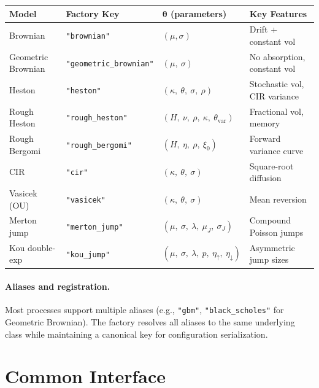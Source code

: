 	\begingroup
	\setlength{\tabcolsep}{3pt}\renewcommand{\arraystretch}{1.1}\scriptsize
	\begin{center}
		\begin{tabular}{@{}p{3cm}p{3.5cm}p{5cm}p{3.5cm}@{}}
			\toprule
			\textbf{Model} & \textbf{Factory Key} & \(\boldsymbol{\theta}\) \textbf{(parameters)} & \textbf{Key Features} \\
			\midrule
			Brownian & \texttt{"brownian"} & \((\mu, \sigma)\) & Drift + constant vol \\
			Geometric Brownian & \texttt{"geometric\_brownian"} & \((\mu,\ \sigma)\) & No absorption, constant vol \\
			Heston & \texttt{"heston"} & \((\kappa,\ \theta,\ \sigma,\ \rho)\) & Stochastic vol, CIR variance \\
			Rough Heston & \texttt{"rough\_heston"} & \((H,\ \nu,\ \rho,\ \kappa,\ \theta_{\text{var}})\) & Fractional vol, memory \\
			Rough Bergomi & \texttt{"rough\_bergomi"} & \((H,\ \eta,\ \rho,\ \xi_0)\) & Forward variance curve \\
			CIR & \texttt{"cir"} & \((\kappa,\ \theta,\ \sigma)\) & Square-root diffusion \\
			Vasicek (OU) & \texttt{"vasicek"} & \((\kappa,\ \theta,\ \sigma)\) & Mean reversion \\
			Merton jump & \texttt{"merton\_jump"} & \((\mu,\ \sigma,\ \lambda,\ \mu_J,\ \sigma_J)\) & Compound Poisson jumps \\
			Kou double-exp & \texttt{"kou\_jump"} & \((\mu,\ \sigma,\ \lambda,\ p,\ \eta_{\!\uparrow},\ \eta_{\!\downarrow})\) & Asymmetric jump sizes \\
			\bottomrule
		\end{tabular}
	\end{center}
	\endgroup
	
	\paragraph{Aliases and registration.}
	Most processes support multiple aliases (e.g., \texttt{"gbm"}, \texttt{"black\_scholes"} for Geometric Brownian). The factory resolves all aliases to the same underlying class while maintaining a canonical key for configuration serialization.
	
	\section{Common Interface}
	
